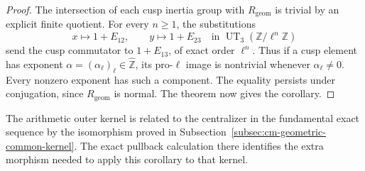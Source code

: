 \begin{proof}
The intersection of each cusp inertia group with
\(R_{\mathrm{geom}}\) is trivial by an explicit finite quotient.
For every \(n\geq1\), the substitutions
\[
 x\longmapsto1+E_{12},\qquad y\longmapsto1+E_{23}
       \quad\text{in }\operatorname{UT}_3(\mathbb Z/\ell^n\mathbb Z)
\]
send the cusp commutator to \(1+E_{13}\), of exact order
\(\ell^n\).
Thus if a cusp element has exponent
\(\alpha=(\alpha_\ell)_\ell\in\widehat{\mathbb Z}\),
its pro-\(\ell\) image is nontrivial whenever
\(\alpha_\ell\neq0\).
Every nonzero exponent has such a component.
The equality persists under conjugation, since
\(R_{\mathrm{geom}}\) is normal.
The theorem now gives the corollary.
\end{proof}

The arithmetic outer kernel is related to the centralizer in the
fundamental exact sequence by the isomorphism proved in
Subsection~\ref{subsec:cm-geometric-common-kernel}.
The exact pullback calculation there identifies the extra
morphism needed to apply this corollary to that kernel.
